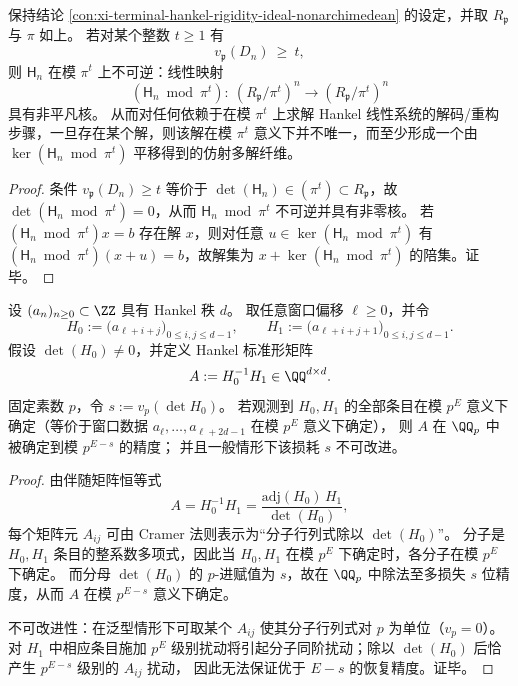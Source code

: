 \begin{proposition}\label{prop:xi-terminal-hankel-modpi-noninvertibility-fiber}
保持结论 \ref{con:xi-terminal-hankel-rigidity-ideal-nonarchimedean} 的设定，并取 \(R_{\mathfrak p}\) 与 \(\pi\) 如上。
若对某个整数 \(t\ge 1\) 有
\[
v_{\mathfrak p}(D_n)\ \ge\ t,
\]
则 \(\mathsf H_n\) 在模 \(\pi^t\) 上不可逆：线性映射
\[
(\mathsf H_n\bmod \pi^t):\ (R_{\mathfrak p}/\pi^t)^{n}\to (R_{\mathfrak p}/\pi^t)^{n}
\]
具有非平凡核。
从而对任何依赖于在模 \(\pi^t\) 上求解 Hankel 线性系统的解码/重构步骤，一旦存在某个解，则该解在模 \(\pi^t\) 意义下并不唯一，而至少形成一个由 \(\ker(\mathsf H_n\bmod\pi^t)\) 平移得到的仿射多解纤维。
\end{proposition}
\begin{proof}
条件 \(v_{\mathfrak p}(D_n)\ge t\) 等价于 \(\det(\mathsf H_n)\in(\pi^t)\subset R_{\mathfrak p}\)，故 \(\det(\mathsf H_n\bmod\pi^t)=0\)，从而 \(\mathsf H_n\bmod\pi^t\) 不可逆并具有非零核。
若 \((\mathsf H_n\bmod\pi^t)x=b\) 存在解 \(x\)，则对任意 \(u\in\ker(\mathsf H_n\bmod\pi^t)\) 有 \((\mathsf H_n\bmod\pi^t)(x+u)=b\)，故解集为 \(x+\ker(\mathsf H_n\bmod\pi^t)\) 的陪集。证毕。
\end{proof}

\begin{theorem}\label{thm:xi-terminal-hankel-standard-form-padic-loss}
设 \((a_n)_{n\ge 0}\subset\ZZ\) 具有 Hankel 秩 \(d\)。
取任意窗口偏移 \(\ell\ge 0\)，并令
\[
H_0:=\bigl(a_{\ell+i+j}\bigr)_{0\le i,j\le d-1},\qquad
H_1:=\bigl(a_{\ell+i+j+1}\bigr)_{0\le i,j\le d-1}.
\]
假设 \(\det(H_0)\neq 0\)，并定义 Hankel 标准形矩阵
\[
A:=H_0^{-1}H_1\in\QQ^{d\times d}.
\]
固定素数 \(p\)，令
\(
s:=v_p(\det H_0)
\)。
若观测到 \(H_0,H_1\) 的全部条目在模 \(p^E\) 意义下确定（等价于窗口数据 \(a_{\ell},\dots,a_{\ell+2d-1}\) 在模 \(p^E\) 意义下确定），
则 \(A\) 在 \(\QQ_p\) 中被确定到模 \(p^{E-s}\) 的精度；
并且一般情形下该损耗 \(s\) 不可改进。
\end{theorem}
\begin{proof}
由伴随矩阵恒等式
\[
A=H_0^{-1}H_1=\frac{\mathrm{adj}(H_0)\,H_1}{\det(H_0)},
\]
每个矩阵元 \(A_{ij}\) 可由 Cramer 法则表示为“分子行列式除以 \(\det(H_0)\)”。
分子是 \(H_0,H_1\) 条目的整系数多项式，因此当 \(H_0,H_1\) 在模 \(p^E\) 下确定时，各分子在模 \(p^E\) 下确定。
而分母 \(\det(H_0)\) 的 \(p\)-进赋值为 \(s\)，故在 \(\QQ_p\) 中除法至多损失 \(s\) 位精度，从而 \(A\) 在模 \(p^{E-s}\) 意义下确定。
\par
不可改进性：在泛型情形下可取某个 \(A_{ij}\) 使其分子行列式对 \(p\) 为单位（\(v_p=0\)）。
对 \(H_1\) 中相应条目施加 \(p^E\) 级别扰动将引起分子同阶扰动；除以 \(\det(H_0)\) 后恰产生 \(p^{E-s}\) 级别的 \(A_{ij}\) 扰动，
因此无法保证优于 \(E-s\) 的恢复精度。证毕。
\end{proof}

